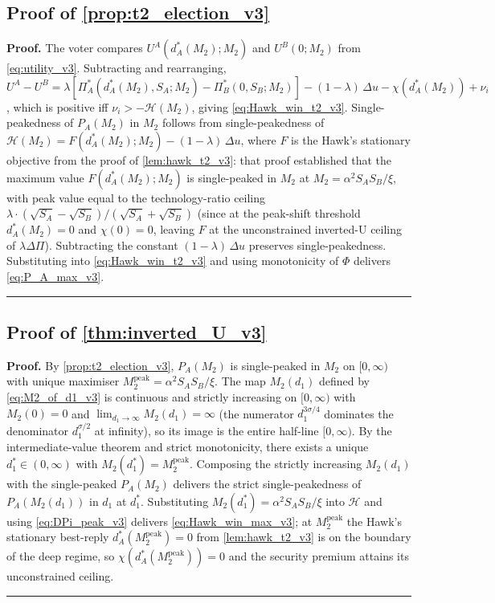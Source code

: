 \documentclass[11pt,twoside]{extarticle}
\newenvironment{proof}[1][Proof]{\noindent \textbf{#1.} }{\ \rule{0.5em}{0.5em}}
\begin{document}
\subsection*{Proof of \autoref{prop:t2_election_v3}} \label{app:proof:t2_election_v3}
\begin{proof}
The voter compares $U^A(d_A^*(M_2);M_2)$ and $U^B(0;M_2)$ from \eqref{eq:utility_v3}. Subtracting and rearranging,
$U^A-U^B=\lambda[\Pi_A^*(d_A^*(M_2),S_A;M_2)-\Pi_B^*(0,S_B;M_2)]-(1-\lambda)\,\Delta u-\chi(d_A^*(M_2))+\nu_i$, which is positive iff $\nu_i>-\mathcal H(M_2)$, giving \eqref{eq:Hawk_win_t2_v3}. Single-peakedness of $P_A(M_2)$ in $M_2$ follows from single-peakedness of $\mathcal H(M_2)=F(d_A^*(M_2);M_2)-(1-\lambda)\,\Delta u$, where $F$ is the Hawk's stationary objective from the proof of \autoref{lem:hawk_t2_v3}: that proof established that the maximum value $F(d_A^*(M_2);M_2)$ is single-peaked in $M_2$ at $M_2=\alpha^2 S_A S_B/\xi$, with peak value equal to the technology-ratio ceiling $\lambda\cdot(\sqrt{S_A}-\sqrt{S_B})/(\sqrt{S_A}+\sqrt{S_B})$ (since at the peak-shift threshold $d_A^*(M_2)=0$ and $\chi(0)=0$, leaving $F$ at the unconstrained inverted-U ceiling of $\lambda\Delta\Pi$). Subtracting the constant $(1-\lambda)\,\Delta u$ preserves single-peakedness. Substituting into \eqref{eq:Hawk_win_t2_v3} and using monotonicity of $\Phi$ delivers \eqref{eq:P_A_max_v3}.
\end{proof}

\subsection*{Proof of \autoref{thm:inverted_U_v3}} \label{app:proof:inverted_U_v3}
\begin{proof}
By \autoref{prop:t2_election_v3}, $P_A(M_2)$ is single-peaked in $M_2$ on $[0,\infty)$ with unique maximiser $M_2^{\mathrm{peak}}=\alpha^2 S_A S_B/\xi$. The map $M_2(d_1)$ defined by \eqref{eq:M2_of_d1_v3} is continuous and strictly increasing on $[0,\infty)$ with $M_2(0)=0$ and $\lim_{d_1\to\infty}M_2(d_1)=\infty$ (the numerator $d_1^{3\sigma/4}$ dominates the denominator $d_1^{\sigma/2}$ at infinity), so its image is the entire half-line $[0,\infty)$. By the intermediate-value theorem and strict monotonicity, there exists a unique $d_1^*\in(0,\infty)$ with $M_2(d_1^*)=M_2^{\mathrm{peak}}$. Composing the strictly increasing $M_2(d_1)$ with the single-peaked $P_A(M_2)$ delivers the strict single-peakedness of $P_A(M_2(d_1))$ in $d_1$ at $d_1^*$. Substituting $M_2(d_1^*)=\alpha^2 S_A S_B/\xi$ into $\mathcal H$ and using \eqref{eq:DPi_peak_v3} delivers \eqref{eq:Hawk_win_max_v3}; at $M_2^{\mathrm{peak}}$ the Hawk's stationary best-reply $d_A^*(M_2^{\mathrm{peak}})=0$ from \autoref{lem:hawk_t2_v3} is on the boundary of the deep regime, so $\chi(d_A^*(M_2^{\mathrm{peak}}))=0$ and the security premium attains its unconstrained ceiling.
\end{proof}
\end{document}
